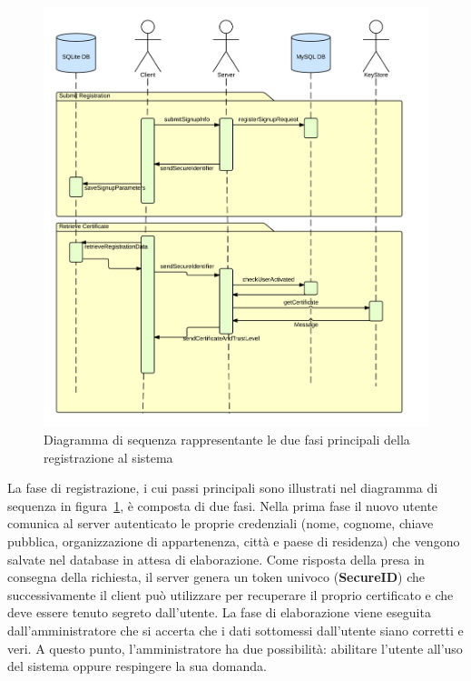 	\begin{center}	
		\begin{figure}[H]
		\centering
		\includegraphics[scale=0.7]{Immagini/signup}
		\caption[Sequence Diagram: Registrazione al Sistema]{Diagramma di sequenza rappresentante le due fasi principali della registrazione al sistema}
		\label{fig:registrazione}
		\end{figure}
	\end{center}
La fase di registrazione, i cui passi principali sono illustrati nel diagramma di sequenza in figura~\ref{fig:registrazione}, è composta di due fasi. Nella prima fase il nuovo utente comunica al server autenticato le proprie credenziali (nome, cognome, chiave pubblica, organizzazione di appartenenza, città e paese di residenza) che vengono salvate nel database in attesa di elaborazione. Come risposta della presa in consegna della richiesta, il server genera un token univoco (\textbf{SecureID}) che successivamente il client può utilizzare per recuperare il proprio certificato e che deve essere tenuto segreto dall'utente. La fase di elaborazione viene eseguita dall'amministratore che si accerta che i dati sottomessi dall'utente siano corretti e veri. A questo punto, l'amministratore ha due possibilità: abilitare l'utente all'uso del sistema oppure respingere la sua domanda.
